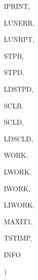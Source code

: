 {\begin{DoxyParamCaption}
\item[{integer}]{I\+P\+R\+I\+N\+T, }
\item[{integer}]{L\+U\+N\+E\+R\+R, }
\item[{integer}]{L\+U\+N\+R\+P\+T, }
\item[{double {\bf precision}, dimension(np)}]{S\+T\+P\+B, }
\item[{double {\bf precision}, dimension(ldstpd,{\bf m})}]{S\+T\+P\+D, }
\item[{integer}]{L\+D\+S\+T\+P\+D, }
\item[{double {\bf precision}, dimension(np)}]{S\+C\+L\+B, }
\item[{double {\bf precision}, dimension(ldscld,{\bf m})}]{S\+C\+L\+D, }
\item[{integer}]{L\+D\+S\+C\+L\+D, }
\item[{double {\bf precision}, dimension(lwork)}]{W\+O\+R\+K, }
\item[{integer}]{L\+W\+O\+R\+K, }
\item[{integer, dimension(liwork)}]{I\+W\+O\+R\+K, }
\item[{integer}]{L\+I\+W\+O\+R\+K, }
\item[{integer}]{M\+A\+X\+I\+T1, }
\item[{double {\bf precision}}]{T\+S\+T\+I\+M\+P, }
\item[{integer}]{I\+N\+F\+O}
\end{DoxyParamCaption}
)}\label{d__odr_8f_a5f39f6e536d450a21d4bbddaf56c2e43}
\hypertarget{d__odr_8f_a9e383388cba6dd167fb5401115e09109}{}
